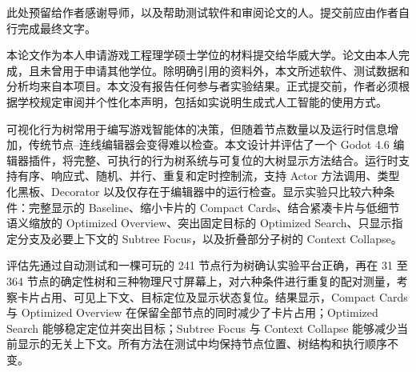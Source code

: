 \frontmatter
{}
\tableofcontents
\clearforchapter\listoffigures
\clearforchapter\listoftables

\ifdefined\omitnontechnicalfrontmatter
\else
{}
此处预留给作者感谢导师，以及帮助测试软件和审阅论文的人。提交前应由作者自行完成最终文字。

本论文作为本人申请游戏工程理学硕士学位的材料提交给华威大学。论文由本人完成，且未曾用于申请其他学位。除明确引用的资料外，本文所述软件、测试数据和分析均来自本项目。本文没有报告任何参与者实验结果。正式提交前，作者必须根据学校规定审阅并个性化本声明，包括如实说明生成式人工智能的使用方式。
\fi

可视化行为树常用于编写游戏智能体的决策，但随着节点数量以及运行时信息增加，传统节点--连线编辑器会变得难以检查。本文设计并评估了一个 Godot 4.6 编辑器插件，将完整、可执行的行为树系统与可复位的大树显示方法结合。运行时支持有序、响应式、随机、并行、重复和定时控制流，支持 Actor 方法调用、类型化黑板、Decorator 以及仅存在于编辑器中的运行检查。显示实验只比较六种条件：完整显示的 Baseline、缩小卡片的 Compact Cards、结合紧凑卡片与低细节语义缩放的 Optimized Overview、突出固定目标的 Optimized Search、只显示指定分支及必要上下文的 Subtree Focus，以及折叠部分子树的 Context Collapse。

评估先通过自动测试和一棵可玩的 241 节点行为树确认实验平台正确，再在 31 至 364 节点的确定性树和三种物理尺寸屏幕上，对六种条件进行重复的配对测量，考察卡片占用、可见上下文、目标定位及显示状态复位。结果显示，Compact Cards 与 Optimized Overview 在保留全部节点的同时减少了卡片占用；Optimized Search 能够稳定定位并突出目标；Subtree Focus 与 Context Collapse 能够减少当前显示的无关上下文。所有方法在测试中均保持节点位置、树结构和执行顺序不变。
